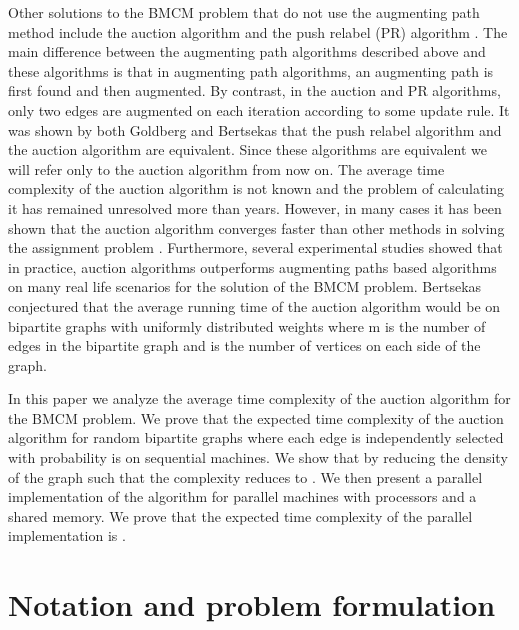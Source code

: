 \documentclass[11pt,onecolumn]{article}
\begin{document}
 Other solutions to the BMCM problem that do not use the augmenting path method include the auction algorithm \cite{bertsekas1979distributed} and the push relabel (PR) algorithm \cite{goldberg1988new}. The main difference between the augmenting path algorithms described above and these algorithms is that in augmenting path algorithms, an augmenting path is first found and then augmented. By contrast, in the auction and PR algorithms, only two edges are augmented on each iteration according to some update rule. It was shown by both Goldberg \cite{goldberg1995efficient} and Bertsekas \cite{bertsekas1992forward} that the push relabel algorithm and the auction algorithm are equivalent. Since these algorithms are equivalent we will refer only to the auction algorithm from now on.
 The average time complexity of the auction algorithm is not known and the problem of calculating it has remained unresolved  more than  years. However, in many cases it has been shown that the auction algorithm converges faster than other methods in solving the assignment problem \cite{bertsekas1990auction}. Furthermore, several experimental studies \cite{setubal1993new,setubal1996sequential,cherkassky1998augment,kaya2012push} showed that in practice, auction algorithms outperforms augmenting paths based algorithms on many real life scenarios for the solution of the BMCM problem. Bertsekas \cite{bertsekas1991reverse} conjectured that the average running time of the auction algorithm would be  on bipartite graphs with uniformly distributed weights where m is the number of edges in the bipartite graph and  is the number of vertices on each side of the graph.

In this paper we analyze the average time complexity of the auction algorithm for the BMCM problem.
We prove that the expected time complexity of the auction algorithm for random bipartite graphs where each edge is independently selected with probability  is   on sequential machines. We show that by reducing the density of the graph such that  the complexity reduces to . We then present a parallel implementation of the algorithm for parallel machines with  processors and a shared memory. We prove that the expected time complexity of the parallel implementation is .

\section {Notation and problem formulation}
\end{document}
